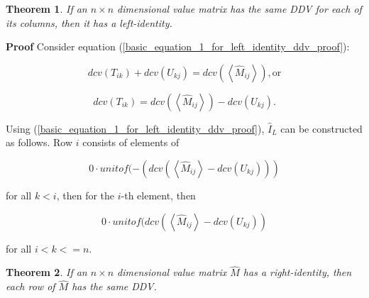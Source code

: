 \documentclass[10pt,letterpaper]{article}
\newtheorem{thm}{Theorem}[section]
\newenvironment{proof}{\noindent\textbf{Proof} }{\qed \newline}
\newcommand{\qed}{\nobreak \ifvmode \relax \else
      \ifdim\lastskip<1.5em \hskip-\lastskip
      \hskip1.5em plus0em minus0.5em \fi \nobreak
      \vrule height0.75em width0.5em depth0.25em\fi}
\numberwithin{equation}{section}
\begin{document}
\begin{thm}If an $n \times n$ dimensional value matrix has the same DDV for each of its columns, then it has a left-identity.\end{thm}

\begin{proof} Consider equation (\ref{basic_equation_1_for_left_identity_ddv_proof}):

\[ dcv(T_{ik}) + dcv(U_{kj}) = dcv( \left\langle \hat M_{ij} \right\rangle ) , \mbox{or} \]

\begin{equation} dcv(T_{ik}) = dcv( \left\langle \hat M_{ij} \right\rangle ) - dcv(U_{kj}) . \end{equation}

Using (\ref{basic_equation_1_for_left_identity_ddv_proof}), $\hat I_L$ can be constructed as follows.  Row $i$ consists of elements of 

\[ 0 \cdot unitof( -(dcv( \left\langle \hat M_{ij} \right\rangle - dcv(U_{kj}))) \]

for all $k < i$, then  for the $i$-th element, then

\[ 0 \cdot unitof( dcv( \left\langle \hat M_{ij} \right\rangle - dcv(U_{kj})) \]

for all $i < k <= n$. \end{proof}

\begin{thm}If an $n \times n$ dimensional value matrix $\hat M$ has a right-identity, then each row of $\hat M$ has the same DDV.\end{thm}
\end{document}
